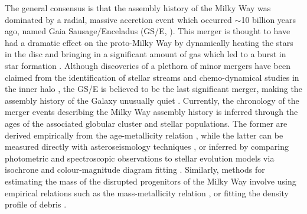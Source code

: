 The general consensus is that the assembly history of the Milky Way was dominated by a radial, massive accretion event which occurred $\sim$10 billion years ago, named Gaia Sausage/Enceladus (GS/E, \citealt{Chiba2000,Brook2003,Meza2005,Belokurov2018,Helmi2018}). This merger is thought to have had a dramatic effect on the proto-Milky Way by dynamically heating the stars in the disc and bringing in a significant amount of gas which led to a burst in star formation \citep{Bignone2019,Grand2020,Ciucua2024}. Although discoveries of a plethora of minor mergers have been claimed from the identification of stellar streams \citep{Malhan2018} and chemo-dynamical studies in the inner halo \citep{Naidu2020,Dodd2023,Horta2023}, the GS/E is believed to be the last significant merger, making the assembly history of the Galaxy unusually quiet \citep{Hammer2007}. Currently, the chronology of the merger events describing the Milky Way assembly history is inferred through the ages of the associated globular cluster and stellar populations. The former are derived empirically from the age-metallicity relation \citep{Kruijssen2019b,Massari2019}, while the latter can be measured directly with asteroseismology techniques \citep{Miglio2017,Montalban2021}, or inferred by comparing photometric and spectroscopic observations to stellar evolution models via isochrone \citep{Sanders2018,Queiroz2018} and colour-magnitude diagram fitting \citep{Gallart2024}. Similarly, methods for estimating the mass of the disrupted progenitors of the Milky Way involve using empirical relations such as the mass-metallicity relation \citep{Harmsen2017,Naidu2022}, or fitting the density profile of debris \citep{Mackereth2020,Lane2023}.



